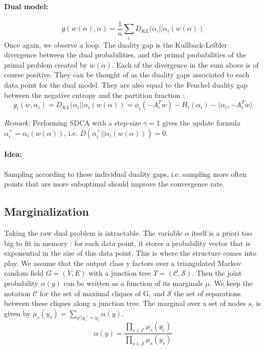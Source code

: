 \documentclass{article}
\begin{document}
\paragraph{Dual model:}

\begin{equation}
	g(w(\alpha),\alpha) = \frac{1}{n} \sum_i D_{KL} (\alpha_i || \alpha_i(w(\alpha))
\end{equation}
Once again, we observe a loop.
The duality gap is the Kullback-Leibler divergence between the dual probabilities, and the primal  probabilities of the primal problem created by $w(\alpha)$.
Each of the divergence in the sum above is of course positive.
They can be thought of as the duality gaps associated to each data point for the dual model.
They are also equal to the Fenchel duality gap between the negative entropy and the partition function :
\begin{equation*}
	g_i(w,\alpha_i) = D_{KL} (\alpha_i || \alpha_i(w(\alpha)) = \phi_i(-A_i^T w) - H_i(\alpha_i) - \langle \alpha_i, -A_i^T w\rangle 
\end{equation*}

\textit{Remark:} Performing SDCA with a step-size $\gamma=1$ gives the update formula $\alpha_i^+ = \alpha_i(w(\alpha))$, i.e. $ D(\alpha_i^+ || \alpha_i(w(\alpha)) )=0$. 

\paragraph{Idea:} Sampling according to these individual duality gaps, i.e. sampling more often points that are more suboptimal should improve the convergence rate.


\subsection{Marginalization}

Taking the raw dual problem is intractable.
The variable $\alpha$ itself is a priori too big to fit in memory : for each data point, it stores a probability vector that is exponential in the size of this data point.
This is where the structure comes into play.
We assume that the output class y factors over a triangulated Markov random field $G=(V,E)$ with a junction tree $T=(\mathcal{C},\mathcal{S})$.
Then the joint probability $\alpha(y)$ can be written as a function of its marginals $\mu$.
We keep the notation $\mathcal{C}$ for the set of maximal cliques of G, and $\mathcal{S}$ the set of separations between these cliques along a junction tree.
The marginal over a set of nodes $s$, is given by $\mu_s(y_s) = \sum_{y' | y_s'=y_s} \alpha(y)$. 
\begin{equation}
	\label{joint from marginals}
	\alpha(y) = \frac{\prod_{c\in\mathcal{C}} \mu_c(y_c)}{\prod_{s\in\mathcal{S}} \mu_s(y_s)}
\end{equation}
\end{document}
